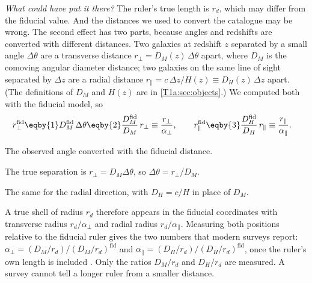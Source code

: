 \emph{What could have put it there?} The ruler's true length is $r_d$, which may
differ from the fiducial value. And the distances we used to convert the
catalogue may be wrong. The second effect has two parts, because angles and
redshifts are converted with different distances. Two galaxies at redshift $z$
separated by a small angle $\Delta\theta$ are a transverse distance
$r_\perp=D_M(z)\,\Delta\theta$ apart, where $D_M$ is the comoving angular
diameter distance; two galaxies on the same line of sight separated by $\Delta z$
are a radial distance $r_\parallel=c\,\Delta z/H(z)\equiv D_H(z)\,\Delta z$
apart. (The definitions of $D_M$ and $H(z)$ are in \cref{T1a:sec:objects}.) We
computed both with the fiducial model, so
\begin{align}
  r_\perp^{\mathrm{fid}}
  &\eqby{1}D_M^{\mathrm{fid}}\,\Delta\theta
   \eqby{2}\frac{D_M^{\mathrm{fid}}}{D_M}\,r_\perp
   \equiv\frac{r_\perp}{\alpha_\perp},
  \qquad
  r_\parallel^{\mathrm{fid}}
   \eqby{3}\frac{D_H^{\mathrm{fid}}}{D_H}\,r_\parallel
   \equiv\frac{r_\parallel}{\alpha_\parallel}.
  \label{11a:eq:alpha-perp-par}
\end{align}
\begin{explain}
  \item The observed angle converted with the fiducial distance.
  \item The true separation is $r_\perp=D_M\Delta\theta$, so
        $\Delta\theta=r_\perp/D_M$.
  \item The same for the radial direction, with $D_H=c/H$ in place of $D_M$.
\end{explain}
A true shell of radius $r_d$ therefore appears in the fiducial coordinates with
transverse radius $r_d/\alpha_\perp$ and radial radius $r_d/\alpha_\parallel$.
Measuring both positions relative to the fiducial ruler gives the two numbers that
modern surveys report: $\alpha_\perp=(D_M/r_d)/(D_M/r_d)^{\mathrm{fid}}$ and
$\alpha_\parallel=(D_H/r_d)/(D_H/r_d)^{\mathrm{fid}}$, once the ruler's own
length is included . Only the ratios $D_M/r_d$ and
$D_H/r_d$ are measured. A survey cannot tell a longer ruler from a smaller
distance.

